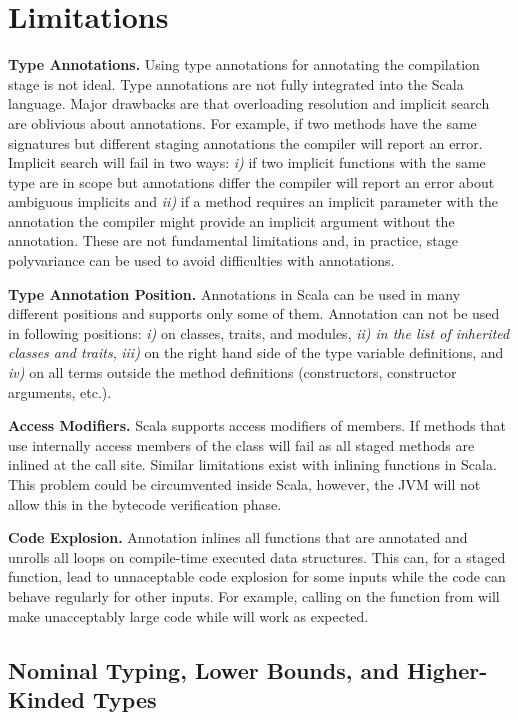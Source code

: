 \section{Limitations}
\label{sct:limitations}

{\bf Type Annotations.} Using type annotations for annotating the compilation stage is not ideal. Type annotations are not fully
 integrated into the Scala language. Major drawbacks are that overloading resolution and implicit search are oblivious about annotations. For example, if two methods have the same signatures but different staging annotations the compiler will report an error. Implicit search will fail in two ways: \emph{i)} if two implicit functions with the same type are in scope but annotations differ the compiler will report an error about ambiguous implicits and \emph{ii)} if a method requires an implicit parameter with the  annotation the compiler might provide an implicit argument without the annotation. These are not fundamental
 limitations and, in practice, stage polyvariance can be used to avoid difficulties with annotations.

{\bf Type Annotation Position.} Annotations in Scala can be used in many different positions and \tool supports only some of them. Annotation  can not be used in following positions: \emph{i)} on classes, traits, and modules, \emph{ii) in the list of inherited classes and traits}, \emph{iii)} on the right hand side of the type variable definitions, and \emph{iv)} on all terms outside the method definitions (constructors, constructor arguments, etc.).

{\bf Access Modifiers.} Scala supports access modifiers of members. If methods that use \tool internally access  members of the class \tool will fail as all staged methods are inlined at the call site. Similar limitations exist with inlining functions in Scala. This problem could be circumvented inside Scala, however, the JVM will not allow this in the bytecode verification phase.

{\bf Code Explosion.} Annotation  inlines all functions that are annotated and unrolls all loops on compile-time executed data structures. This can, for a staged function, lead to unnaceptable code explosion for some inputs while the code can behave regularly for other inputs. For example, calling  on the function from  will make unacceptably large code while  will work as expected.

\subsection{Nominal Typing, Lower Bounds, and Higher-Kinded Types}
\label{sct:nominal-typing}
